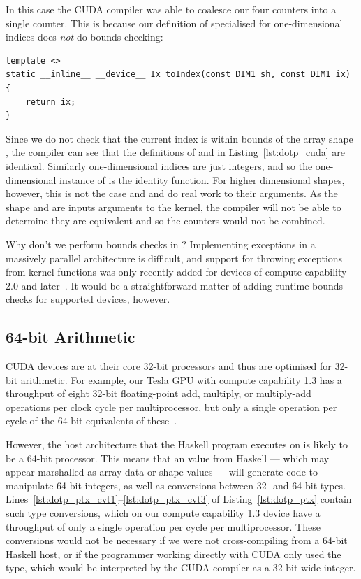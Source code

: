 In this case the CUDA compiler was able to coalesce our four counters into a
single counter. This is because our definition of  specialised for
one-dimensional indices  does \emph{not} do bounds checking:
%
\begin{lstlisting}[style=cuda]
template <>
static __inline__ __device__ Ix toIndex(const DIM1 sh, const DIM1 ix)
{
    return ix;
}
\end{lstlisting}
%
Since we do not check that the current index  is within bounds of the
array shape , the compiler can see that the definitions of 
and  in Listing~\ref{lst:dotp_cuda} are identical. Similarly
one-dimensional indices are just integers, and so the one-dimensional instance
of  is the identity function. For higher dimensional shapes,
however, this is not the case and  and  do real work
to their arguments. As the shape  and  are inputs
arguments to the kernel, the compiler will not be able to determine they are
equivalent and so the counters would not be combined.

Why don't we perform bounds checks in ? Implementing exceptions in
a massively parallel architecture is difficult, and support for throwing
exceptions from kernel functions was only recently added for devices of compute
capability 2.0 and later~\cite{NVIDIA:2012wf}. %
It would be a straightforward matter of adding runtime bounds checks for
supported devices, however.


\subsection{64-bit Arithmetic}

CUDA devices are at their core 32-bit processors and thus are optimised for
32-bit arithmetic. For example, our Tesla GPU with compute capability 1.3 has a
throughput of eight 32-bit floating-point add, multiply, or multiply-add
operations per clock cycle per multiprocessor, but only a single operation per
cycle of the 64-bit equivalents of these~\cite{NVIDIA:2012wf}. %

However, the host architecture that the Haskell program executes on is likely to
be a 64-bit processor. This means that an  value from Haskell ---
which may appear marshalled as array data or shape values --- will generate code
to manipulate 64-bit integers, as well as conversions between 32- and 64-bit
types. Lines~\ref{lst:dotp_ptx_cvt1}--\ref{lst:dotp_ptx_cvt3} of
Listing~\ref{lst:dotp_ptx} contain such type conversions, which on our compute
capability 1.3 device have a throughput of only a single operation per cycle per
multiprocessor. These conversions would not be necessary if we were not
cross-compiling from a 64-bit Haskell host, or if the programmer working
directly with CUDA only used the  type, which would be interpreted by
the CUDA compiler as a 32-bit wide integer.


